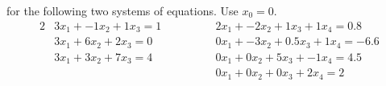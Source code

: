 \documentclass[12pt, answers]{exam}
\begin{document}
\begin{questions}
%
for the following two systems of equations. Use $x_0 = 0$.
%
\newcommand{\aaa}{3}
\newcommand{\aab}{-1}
\newcommand{\aac}{1}
\newcommand{\aba}{3}
\newcommand{\abb}{6}
\newcommand{\abc}{2}
\newcommand{\aca}{3}
\newcommand{\acb}{3}
\newcommand{\acc}{7}
\newcommand{\ba}{1}
\newcommand{\bb}{0}
\newcommand{\bc}{4}
\newcommand{\caa}{2}
\newcommand{\cab}{-2}
\newcommand{\cac}{1}
\newcommand{\cad}{1}
\newcommand{\cba}{0}
\newcommand{\cbb}{-3}
\newcommand{\cbc}{0.5}
\newcommand{\cbd}{1}
\newcommand{\cca}{0}
\newcommand{\ccb}{0}
\newcommand{\ccc}{5}
\newcommand{\ccd}{-1}
\newcommand{\cda}{0}
\newcommand{\cdb}{0}
\newcommand{\cdc}{0}
\newcommand{\cdd}{2}
\newcommand{\ca}{0.8}
\newcommand{\cb}{-6.6}
\newcommand{\cc}{4.5}
\newcommand{\cd}{2}
%
\begin{alignat}{2}
&\aaa x_1 + \aab x_2 + \aac x_3 = \ba \qquad\qquad 
&\caa x_1 + \cab x_2 + \cac x_3 + \cad x_4 = \ca \nonumber \\
%
&\aba x_1 + \abb x_2 + \abc x_3 = \bb \qquad\qquad 
&\cba x_1 + \cbb x_2 + \cbc x_3 + \cbd x_4 = \cb \nonumber \\
%
&\aca x_1 + \acb x_2 + \acc x_3 = \bc \qquad \qquad
&\cca x_1 + \ccb x_2 + \ccc x_3 + \ccd x_4 = \cc \nonumber \\
%
& \qquad \qquad
&\cda x_1 + \cdb x_2 + \cdc x_3 + \cdd x_4 = \cd \nonumber
%
\end{alignat}


\vspace*{3em}
\addpoints
\question[50]


\end{questions}
\end{document}
